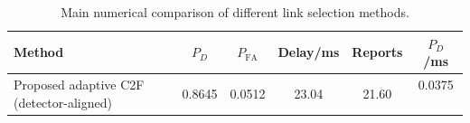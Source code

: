 \begin{table}[t]
    \centering
    \caption{Main numerical comparison of different link selection methods.}
    \label{tab:main_summary}
    \begin{tabular}{l c c c c c}
        \hline
        Method & $P_D$ & $P_{\mathrm{FA}}$ & Delay/ms & Reports & $P_D$/ms \\
        \hline
        Proposed adaptive C2F (detector-aligned) & 0.8645 & 0.0512 & 23.04 & 21.60 & 0.0375 \
        \hline
    \end{tabular}
\end{table}
